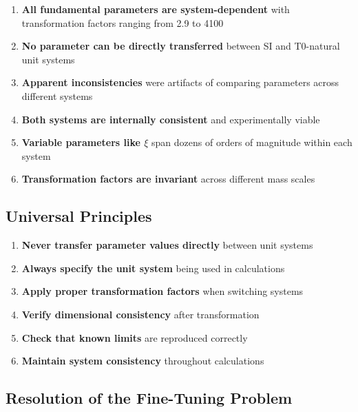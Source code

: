 \documentclass[12pt,a4paper]{article}
\newcommand{\xipar}{\xi}
\begin{document}
	\begin{enumerate}
		\item \textbf{All fundamental parameters are system-dependent} with transformation factors ranging from 2.9 to 4100
		\item \textbf{No parameter can be directly transferred} between SI and T0-natural unit systems
		\item \textbf{Apparent inconsistencies} were artifacts of comparing parameters across different systems
		\item \textbf{Both systems are internally consistent} and experimentally viable
		\item \textbf{Variable parameters like $\xipar$} span dozens of orders of magnitude within each system
		\item \textbf{Transformation factors are invariant} across different mass scales
	\end{enumerate}
	
	\subsection{Universal Principles}
	\label{subsec:universal_principles}
	
	\begin{tcolorbox}[colback=green!5!white,colframe=green!75!black,title=Universal Parameter Transfer Rules]
		\begin{enumerate}
			\item \textbf{Never transfer parameter values directly} between unit systems
			\item \textbf{Always specify the unit system} being used in calculations
			\item \textbf{Apply proper transformation factors} when switching systems
			\item \textbf{Verify dimensional consistency} after transformation
			\item \textbf{Check that known limits} are reproduced correctly
			\item \textbf{Maintain system consistency} throughout calculations
		\end{enumerate}
	\end{tcolorbox}
	
	\subsection{Resolution of the Fine-Tuning Problem}
	\label{subsec:fine_tuning_resolution}
	
\end{document}
